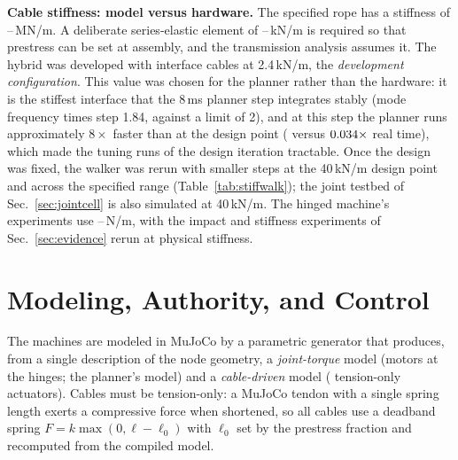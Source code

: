 \documentclass[letterpaper, 10pt, conference]{ieeeconf}
\begin{document}
\textbf{Cable stiffness: model versus hardware.} The specified rope has a
stiffness of \kRopeMin--\kRopeMax\,MN/m. A deliberate series-elastic
element of \kSeriesMin--\kSeriesMax\,kN/m \cite{pratt1995series} is
required so that prestress can be set at assembly, and the transmission
analysis assumes it. The hybrid was developed with interface cables at
2.4\,kN/m, the \emph{development configuration}. This value was chosen for the planner rather than the hardware: it is
the stiffest interface that the 8\,ms planner step integrates stably (mode
frequency times step 1.84, against a limit of 2), and at this step the
planner runs approximately $8\times$ faster than at the design point
(\hybridRt{} versus $0.034\times$ real time), which made the tuning runs of the design iteration tractable. Once the design was fixed, the walker was rerun with smaller steps at
the 40\,kN/m design point and across the specified range
(Table~\ref{tab:stiffwalk}); the joint testbed of Sec.~\ref{sec:jointcell}
is also simulated at 40\,kN/m. The hinged
machine's experiments use \kModelMin--\kModelMax\,N/m, with the impact and
stiffness experiments of Sec.~\ref{sec:evidence} rerun at physical
stiffness.

\section{Modeling, Authority, and Control}
\label{sec:authority}
The machines are modeled in MuJoCo \cite{todorov2012mujoco} by a
parametric generator that produces, from a single description of the node
geometry, a \emph{joint-torque} model (motors at the hinges; the planner's
model) and a \emph{cable-driven} model (\numActuatable{} tension-only
actuators). Cables must be tension-only: a MuJoCo tendon with a single
spring length exerts a compressive force when shortened, so all cables use
a deadband spring $F=k\max(0,\ell-\ell_0)$ with $\ell_0$ set by the
prestress fraction and recomputed from the compiled model.
\end{document}
